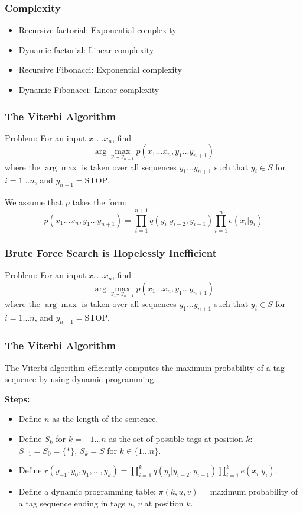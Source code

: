 \documentclass[handout]{beamer}
\begin{document}
\begin{frame}
  \frametitle{Complexity}

  \begin{itemize}
    \item Recursive factorial: Exponential complexity
    \item Dynamic factorial: Linear complexity
    \item Recursive Fibonacci: Exponential complexity
    \item Dynamic Fibonacci: Linear complexity
  \end{itemize}

\end{frame}




\begin{frame}
  \frametitle{The Viterbi Algorithm}
  Problem: For an input $x_1 \ldots x_n$, find
  \[
    \arg \max_{y_1 \ldots y_{n+1}} p(x_1 \ldots x_n, y_1 \ldots y_{n+1})
  \]
  where the $\arg \max$ is taken over all sequences $y_1 \ldots y_{n+1}$ such that $y_i \in S$ for $i = 1 \ldots n$, and $y_{n+1} = \text{STOP}$.

  We assume that $p$ takes the form:
  \[
    p(x_1 \ldots x_n, y_1 \ldots y_{n+1}) = \prod_{i=1}^{n+1} q(y_i|y_{i-2}, y_{i-1}) \prod_{i=1}^{n} e(x_i|y_i)
  \]
\end{frame}

\begin{frame}
  \frametitle{Brute Force Search is Hopelessly Inefficient}
  Problem: For an input $x_1 \ldots x_n$, find
  \[
    \arg \max_{y_1 \ldots y_{n+1}} p(x_1 \ldots x_n, y_1 \ldots y_{n+1})
  \]
  where the $\arg \max$ is taken over all sequences $y_1 \ldots y_{n+1}$ such that $y_i \in S$ for $i = 1 \ldots n$, and $y_{n+1} = \text{STOP}$.
\end{frame}

\begin{frame}
  \frametitle{The Viterbi Algorithm}
  The Viterbi algorithm efficiently computes the maximum probability of a tag sequence by using dynamic programming.

  \textbf{Steps:}
  \begin{itemize}
    \item Define $n$ as the length of the sentence.
    \item Define $S_k$ for $k = -1 \ldots n$ as the set of possible tags at position $k$: $S_{-1} = S_0 = \{*\}$, $S_k = S$ for $k \in \{1 \ldots n\}$.
    \item Define $r(y_{-1}, y_0, y_1, \ldots, y_k) = \prod_{i=1}^k q(y_i|y_{i-2}, y_{i-1}) \prod_{i=1}^k e(x_i|y_i)$.
    \item Define a dynamic programming table: $\pi(k, u, v)$ = maximum probability of a tag sequence ending in tags $u$, $v$ at position $k$.
  \end{itemize}
\end{frame}
\end{document}
